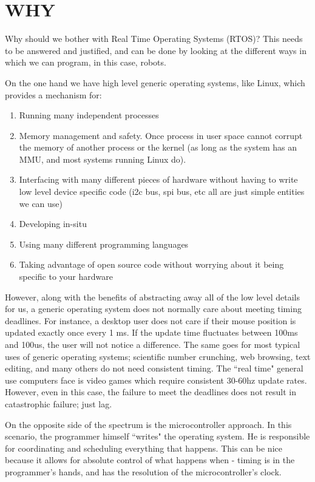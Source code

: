 \documentclass{article}
\begin{document}
\section{WHY}
Why should we bother with Real Time Operating Systems (RTOS)?  This needs to be answered and justified, and can be done by looking at the different ways in which we can program, in this case, robots.  

On the one hand we have high level generic operating systems, like Linux, which provides a mechanism for:
\begin{enumerate}
    \item Running many independent processes
    \item Memory management and safety.  Once process in user space cannot corrupt the memory of another process or the kernel (as long as the system has an MMU, and most systems running Linux do).
    \item Interfacing with many different pieces of hardware without having to write low level device specific code (i2c bus, spi bus, etc all are just simple entities we can use)
    \item Developing in-situ
    \item Using many different programming languages
    \item Taking advantage of open source code without worrying about it being specific to your hardware 
\end{enumerate}

However, along with the benefits of abstracting away all of the low level details for us, a generic operating system does not normally care about meeting timing deadlines.  For instance, a desktop user does not care if their mouse position is updated exactly once every 1 ms.  If the update time fluctuates between 100ms and 100us, the user will not notice a difference.  The same goes for most typical uses of generic operating systems; scientific number crunching, web browsing, text editing, and many others do not need consistent timing.  The ``real time" general use computers face is video games which require consistent 30-60hz update rates.  However, even in this case, the failure to meet the deadlines does not result in catastrophic failure; just lag.

On the opposite side of the spectrum is the microcontroller approach.  In this scenario, the programmer himself ``writes" the operating system.  He is responsible for coordinating and scheduling everything that happens.  This can be nice because it allows for absolute control of what happens when - timing is in the programmer's hands, and has the resolution of the microcontroller's clock.
\end{document}
